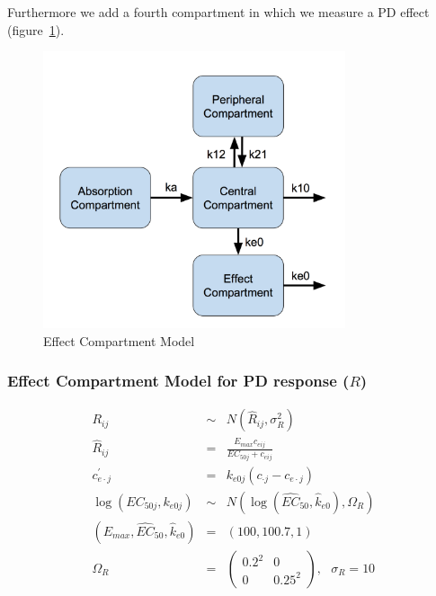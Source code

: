 \documentclass[11pt]{amsart}
\begin{document}
Furthermore we add a fourth compartment in which we measure a PD effect (figure~\ref{effCptModel}).

\begin{figure}[htbp]
\includegraphics[width=3.5in,trim=0in 0in 0 0in]{graphics/effCptModel.png}
\caption{Effect Compartment Model}
\label{effCptModel}
\end{figure}

\subsubsection*{Effect Compartment Model for PD response ($R$)}
\begin{eqnarray*}
R_{ij} &\sim& N\left(\widehat{R}_{ij},\sigma_{R}^2\right) \\
\widehat{R}_{ij} &=& \frac{E_{max}c_{eij}}{EC_{50j} + c_{eij}} \\
c_{e\cdot j}^\prime &=& k_{e0j}\left(c_{\cdot j} - c_{e\cdot j}\right) \\
\log\left(EC_{50j}, k_{e0j}\right) &\sim& N\left(\log\left(\widehat{EC}_{50}, \widehat{k}_{e0}\right),\Omega_R\right) \\
\left(E_{max}, \widehat{EC}_{50},\widehat{k}_{e0}\right) &=& \left(100, 100.7, 1\right) \\
\Omega_R &=& \left(\begin{array}{cc} 0.2^2 & 0 \\ 0 & 0.25^2  \end{array}\right), \ \ \ \sigma_R = 10
\end{eqnarray*}
\end{document}
